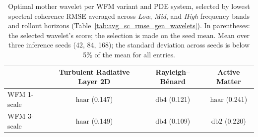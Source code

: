\begin{table}[ht]
\centering
\caption{Optimal mother wavelet per WFM variant and PDE system, selected by lowest spectral coherence RMSE averaged across \textit{Low}, \textit{Mid}, and \textit{High} frequency bands and rollout horizons (Table~\ref{tab:avg_sc_rmse_gen_wavelets}). In parentheses: the selected wavelet's score; the selection is made on the seed mean. Mean over three inference seeds (42, 84, 168); the standard deviation across seeds is below 5\% of the mean for all entries.}
\label{si-tab:optimal_wavelets}
\begin{tabular}{lccc}
\toprule
 & Turbulent Radiative Layer 2D & Rayleigh--B\'{e}nard & Active Matter \\
\midrule
WFM 1-scale & $\mathrm{haar}$ (0.147) & $\mathrm{db}4$ (0.121) & $\mathrm{haar}$ (0.241) \\
WFM 3-scale & $\mathrm{haar}$ (0.149) & $\mathrm{db}4$ (0.109) & $\mathrm{db}2$ (0.220) \\
\bottomrule
\end{tabular}
\end{table}
